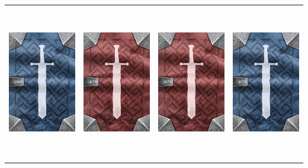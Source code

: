 \documentclass{minimal}
\begin{document}
{\begin{longtable}{llll}
\includegraphics[width=44mm,height=68mm]{./64-151/gh-080a-tremor-blade-back.png} &
\includegraphics[width=44mm,height=68mm]{./64-151/gh-079b-inferno-blade-back.png} &
\includegraphics[width=44mm,height=68mm]{./64-151/gh-079b-inferno-blade-back.png} &
\includegraphics[width=44mm,height=68mm]{./64-151/gh-079a-inferno-blade-back.png}\\ 

\end{longtable}}
\end{document}
